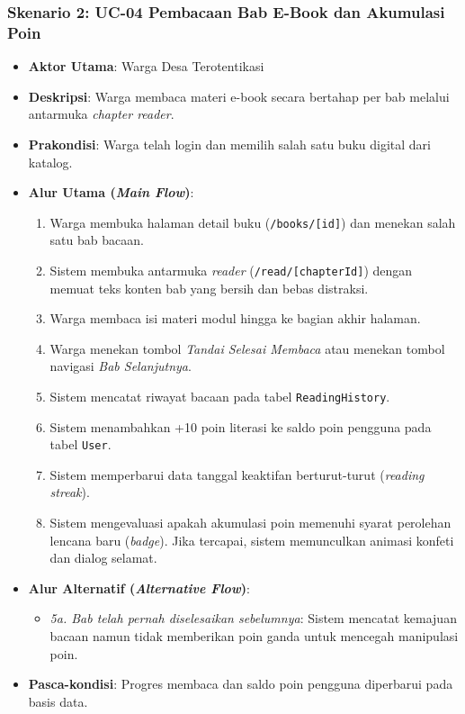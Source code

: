 \documentclass[
  indonesian,
  12pt,
]{report}
\providecommand{\tightlist}{%
  \setlength{\itemsep}{0pt}\setlength{\parskip}{0pt}}
\begin{document}
\subsubsection{Skenario 2: UC-04 Pembacaan Bab E-Book dan Akumulasi
Poin}\label{skenario-2-uc-04-pembacaan-bab-e-book-dan-akumulasi-poin}

\begin{itemize}
\tightlist
\item
  \textbf{Aktor Utama}: Warga Desa Terotentikasi
\item
  \textbf{Deskripsi}: Warga membaca materi e-book secara bertahap per
  bab melalui antarmuka \emph{chapter reader}.
\item
  \textbf{Prakondisi}: Warga telah login dan memilih salah satu buku
  digital dari katalog.
\item
  \textbf{Alur Utama (\emph{Main Flow})}:

  \begin{enumerate}
  \def\labelenumi{\arabic{enumi}.}
  \tightlist
  \item
    Warga membuka halaman detail buku (\texttt{/books/{[}id{]}}) dan
    menekan salah satu bab bacaan.
  \item
    Sistem membuka antarmuka \emph{reader}
    (\texttt{/read/{[}chapterId{]}}) dengan memuat teks konten bab yang
    bersih dan bebas distraksi.
  \item
    Warga membaca isi materi modul hingga ke bagian akhir halaman.
  \item
    Warga menekan tombol \emph{Tandai Selesai Membaca} atau menekan
    tombol navigasi \emph{Bab Selanjutnya}.
  \item
    Sistem mencatat riwayat bacaan pada tabel \texttt{ReadingHistory}.
  \item
    Sistem menambahkan +10 poin literasi ke saldo poin pengguna pada
    tabel \texttt{User}.
  \item
    Sistem memperbarui data tanggal keaktifan berturut-turut
    (\emph{reading streak}).
  \item
    Sistem mengevaluasi apakah akumulasi poin memenuhi syarat perolehan
    lencana baru (\emph{badge}). Jika tercapai, sistem memunculkan
    animasi konfeti dan dialog selamat.
  \end{enumerate}
\item
  \textbf{Alur Alternatif (\emph{Alternative Flow})}:

  \begin{itemize}
  \tightlist
  \item
    \emph{5a. Bab telah pernah diselesaikan sebelumnya}: Sistem mencatat
    kemajuan bacaan namun tidak memberikan poin ganda untuk mencegah
    manipulasi poin.
  \end{itemize}
\item
  \textbf{Pasca-kondisi}: Progres membaca dan saldo poin pengguna
  diperbarui pada basis data.
\end{itemize}
\end{document}
